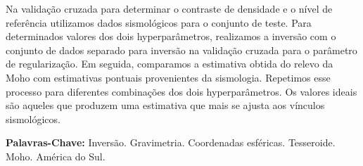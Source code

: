 \documentclass[12pt]{letter}
\begin{document}
Na validação cruzada para determinar o contraste de densidade e o nível de
referência utilizamos dados sismológicos para o conjunto de teste.
Para determinados valores dos dois hyperparâmetros, realizamos a inversão com o
conjunto de dados separado para inversão na validação cruzada para o parâmetro
de regularização.
Em seguida, comparamos a estimativa obtida do relevo da Moho com estimativas
pontuais provenientes da sismologia.
Repetimos esse processo para diferentes combinações dos dois hyperparâmetros.
Os valores ideais são aqueles que produzem uma estimativa que mais se ajusta
aos vínculos sismológicos.



\textbf{Palavras-Chave:}
Inversão. Gravimetria. Coordenadas esféricas. Tesseroide. Moho. América do Sul.
\end{document}
